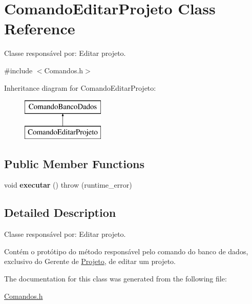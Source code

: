 \hypertarget{class_comando_editar_projeto}{}\section{Comando\+Editar\+Projeto Class Reference}
\label{class_comando_editar_projeto}


Classe responsável por\+: Editar projeto.  




{\ttfamily \#include $<$Comandos.\+h$>$}

Inheritance diagram for Comando\+Editar\+Projeto\+:\begin{figure}[H]
\begin{center}
\leavevmode
\includegraphics[height=2.000000cm]{class_comando_editar_projeto}
\end{center}
\end{figure}
\subsection*{Public Member Functions}
\begin{DoxyCompactItemize}
\item 
\hypertarget{class_comando_editar_projeto_a8ce95f26c60777abd0cad6426c913f6b}{}\label{class_comando_editar_projeto_a8ce95f26c60777abd0cad6426c913f6b} 
void {\bfseries executar} ()  throw (runtime\+\_\+error)
\end{DoxyCompactItemize}


\subsection{Detailed Description}
Classe responsável por\+: Editar projeto. 

Contém o protótipo do método responsável pelo comando do banco de dados, exclusivo do Gerente de \hyperlink{class_projeto}{Projeto}, de editar um projeto. 

The documentation for this class was generated from the following file\+:\begin{DoxyCompactItemize}
\item 
\hyperlink{_comandos_8h}{Comandos.\+h}\end{DoxyCompactItemize}
